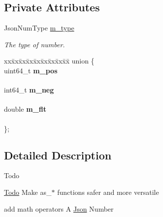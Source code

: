 \subsection*{Private Attributes}
\begin{DoxyCompactItemize}
\item 
\mbox{\label{classnta_1_1utils_1_1JsonNum_abd54e505bcd33dc45877c4b4bb92fa4e}} 
Json\+Num\+Type \hyperlink{classnta_1_1utils_1_1JsonNum_abd54e505bcd33dc45877c4b4bb92fa4e}{m\+\_\+type}
\begin{DoxyCompactList}\small\item\em The type of number. \end{DoxyCompactList}\item 
\mbox{\label{classnta_1_1utils_1_1JsonNum_a8f60aff135bd41d1680ecdaa738a4a02}} 
\begin{tabbing}
xx\=xx\=xx\=xx\=xx\=xx\=xx\=xx\=xx\=\kill
union \{\\
\mbox{\label{classnta_1_1utils_1_1JsonNum_a266052a158fca895978bb7d9ec43f6ff}} 
uint64\_t {\bfseries m\_pos}\\
\>\\
\mbox{\label{classnta_1_1utils_1_1JsonNum_af488d5d931bc8979df8671070365ac2b}} 
int64\_t {\bfseries m\_neg}\\
\>\\
\mbox{\label{classnta_1_1utils_1_1JsonNum_a01cf51bb14293115a5b3f140ade23d4d}} 
double {\bfseries m\_flt}\\
\>\\
\}; \\

\end{tabbing}\end{DoxyCompactItemize}


\subsection{Detailed Description}
\begin{DoxyRefDesc}{Todo}
\item[\hyperlink{todo__todo000005}{Todo}]Make as\+\_\+$\ast$ functions safer and more versatile 

add math operators A \hyperlink{classnta_1_1utils_1_1Json}{Json} Number \end{DoxyRefDesc}


